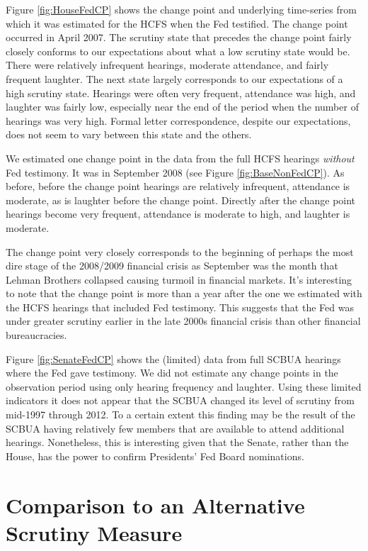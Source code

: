 \documentclass[a4paper]{article}\usepackage[]{graphicx}\usepackage[]{color}
\begin{document}
Figure \ref{fig:HouseFedCP} shows the change point and underlying time-series from which it was estimated for the HCFS when the Fed testified. The change point occurred in April 2007. The scrutiny state that precedes the change point fairly closely conforms to our expectations about what a low scrutiny state would be. There were relatively infrequent hearings, moderate attendance, and fairly frequent laughter. The next state largely corresponds to our expectations of a high scrutiny state. Hearings were often very frequent, attendance was high, and laughter was fairly low, especially near the end of the period when the number of hearings was very high. Formal letter correspondence, despite our expectations, does not seem to vary between this state and the others.

We estimated one change point in the data from the full HCFS hearings \emph{without} Fed testimony. It was in September 2008 (see Figure \ref{fig:BaseNonFedCP}). As before, before the change point hearings are relatively infrequent, attendance is moderate, as is laughter before the change point. Directly after the change point hearings become very frequent, attendance is moderate to high, and laughter is moderate.

The change point very closely corresponds to the beginning of perhaps the most dire stage of the 2008/2009 financial crisis as September was the month that Lehman Brothers collapsed causing turmoil in financial markets. It's interesting to note that the change point is more than a year after the one we estimated with the HCFS hearings that included Fed testimony. This suggests that the Fed was under greater scrutiny earlier in the late 2000s financial crisis than other financial bureaucracies.

Figure \ref{fig:SenateFedCP} shows the (limited) data from full SCBUA hearings where the Fed gave testimony. We did not estimate any change points in the observation period using only hearing frequency and laughter. Using these limited indicators it does not appear that the SCBUA changed its level of scrutiny from mid-1997 through 2012. To a certain extent this finding may be the result of the SCBUA having relatively few members that are available to attend additional hearings. Nonetheless, this is interesting given that the Senate, rather than the House, has the power to confirm Presidents' Fed Board nominations.

\section{Comparison to an Alternative Scrutiny Measure}
\end{document}

